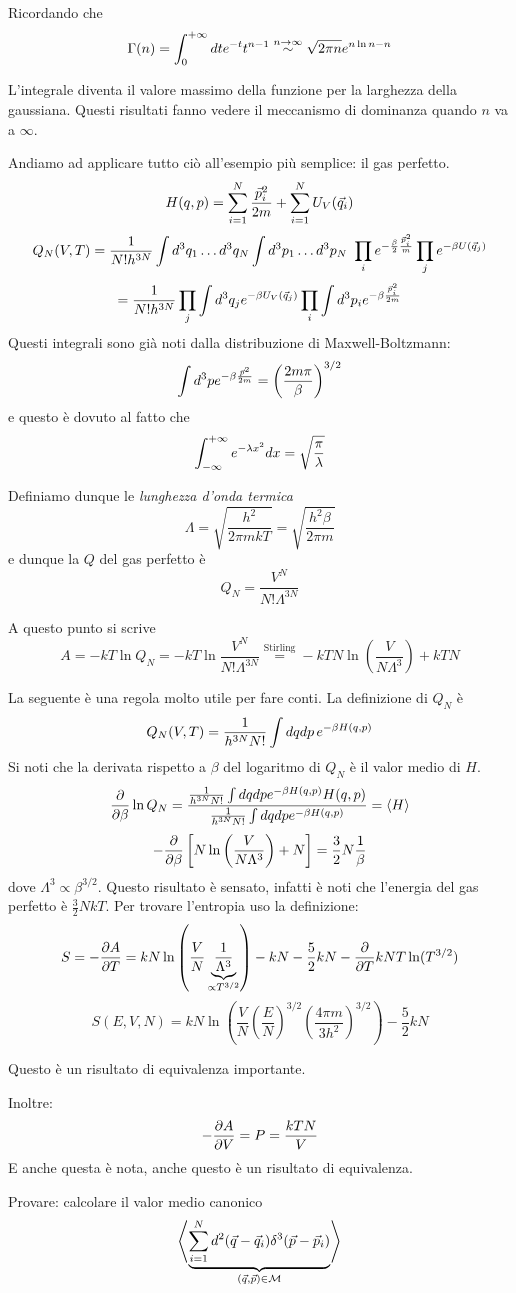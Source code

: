 \documentclass[../MeccanicaStatistica.tex]{subfiles}
\begin{document}
Ricordando che
\[
\Gamma(n) = \int_0^{+\infty} d t e^{-t} t^{n-1} \overset{n \to \infty}{\sim} \sqrt{2 \pi n} e^{n \ln n - n}
\]

L'integrale diventa il valore massimo della funzione per la larghezza della gaussiana. Questi risultati fanno vedere il meccanismo di dominanza quando $n$ va a $\infty$.

Andiamo ad applicare tutto ciò all'esempio più semplice: il gas perfetto.
\[
H(q,p) = \sum_{i = 1}^N \frac{\vec p_i^2}{2m} + \sum_{i = 1}^N U_V(\vec q_i)
\]
\[
Q_N(V,T) = \frac{1}{N! h^{3N}} \int d^3 q_1 \dots d^3 q_N \int d^3 p_1 \dots d^3 p_N \ \prod_i e^{-\frac{\beta}{2} \frac{\vec p_i^2}{m}} \prod_j e^{- \beta U(\vec q_j)}
\]
\[
= \frac{1}{N! h^{3N}} \prod_j \int d^3 q_j e^{- \beta U_V(\vec q_j)} \prod_i \int d^3 p_i e^{- \beta \frac{\vec p_i^2}{2m}}
\]
Questi integrali sono già noti dalla distribuzione di Maxwell-Boltzmann:
\[
\int d^3 p e^{- \beta \frac{\vec p^2}{2m}} = \left(\frac{2 m \pi}{\beta}\right)^{3/2}
\]
e questo è dovuto al fatto che
\[
\int_{- \infty}^{+ \infty} e^{- \lambda x^2} d x = \sqrt{\frac{\pi}{\lambda}}
\]


Definiamo dunque le \emph{lunghezza d'onda termica}
\[
\Lambda = \sqrt{\frac{h^2}{2 \pi m k T}} = \sqrt{\frac{h^2 \beta}{2 \pi m}}
\]
e dunque la $Q$ del gas perfetto è
\[
Q_N = \frac{V^N}{N! \Lambda^{3N}}
\]

A questo punto si scrive 
\[
A = - k T \ln Q_N = - k T \ln \frac{V^N}{N! \Lambda^{3N}} \overset{\text{Stirling}}{=} - k T N \ln\left(\frac{V}{N \Lambda^3}\right) + k T N
\]


La seguente è una regola molto utile per fare conti. La definizione di $Q_N$ è
\[
Q_N(V,T) = \frac{1}{h^{3N} N!} \int d q d p \, e^{- \beta H(q,p)}
\]
Si noti che la derivata rispetto a $\beta$ del logaritmo di $Q_N$ è il valor medio di $H$.
\[
\frac{\partial }{\partial \beta} \ln Q_N = \frac{\frac{1}{h^{3N} N!} \int d q d p e^{- \beta H(q,p)} H(q,p)}{\frac{1}{h^{3N} N!} \int d q d p e^{- \beta H(q,p)}} = \left\langle{H}\right\rangle
\]
\[
-\frac{\partial }{\partial \beta} \left[N \ln\left(\frac{V}{N \Lambda^3}\right) + N \right] = \frac{3}{2} N \frac{1}{\beta}
\]
dove $\Lambda^3 \propto \beta^{3/2}$. Questo risultato è sensato, infatti è noti che l'energia del gas perfetto è $\frac{3}{2}NkT$. Per trovare l'entropia uso la definizione:
\[
S = - \frac{\partial A}{\partial T} = k N \ln\left(\frac{V}{N} \underbrace{\frac{1}{\Lambda^3}}_{\propto T^{3/2}} \right) - k N - \frac{5}{2} k N - \frac{\partial }{\partial T} k N T \ln(T^{3/2})
\]
\[
S(E,V,N) = k N \ln\left(\frac{V}{N}  \left(\frac{E}{N}\right)^{3/2} \left(\frac{4 \pi m}{3 h^2}\right)^{3/2} \right) - \frac{5}{2} k N
\]

Questo è un risultato di equivalenza importante.

Inoltre:
\[
-\frac{\partial A}{\partial V} = P = \frac{k T N}{V}
\]
E anche questa è nota, anche questo è un risultato di equivalenza.

Provare: calcolare il valor medio canonico
\[
\left\langle{ \underbrace{\sum_{i = 1}^N d^2(\vec q - \vec q_i) \delta^3 (\vec p - \vec p_i)}_{(\vec q, \vec p) \in \mathcal M} }\right\rangle
\]
\end{document}
